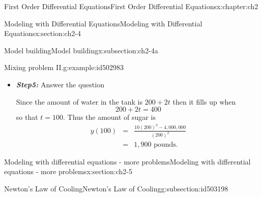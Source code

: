 \documentclass[oneside,10pt,]{book}
\newcommand{\alert}[1]{\textbf{\textit{#1}}}
\numberwithin{equation}{section}
\numberwithin{equation}{section}
\newcommand{\amp}{&}
\begin{document}
\begin{chapterptx}{First Order Differential Equations}{}{First Order Differential Equations}{}{}{x:chapter:ch2}
\begin{sectionptx}{Modeling with Differential Equations}{}{Modeling with Differential Equations}{}{}{x:section:ch2-4}
\begin{subsectionptx}{Model building}{}{Model building}{}{}{x:subsection:ch2-4a}
\begin{example}{Mixing problem II.}{g:example:id502983}
\begin{itemize}[label=\textbullet]
Thus using the formula, we have that%
\begin{align*}
y(t) \amp = \amp \frac{1}{\mu(t)}\left[\int\mu(t)b(t)dt.+C\right]\\
\amp = \amp \frac{1}{\left(100+t\right)^{2}}\left[30\int\left(100+t\right)^{2}dt.+C\right]\\
\amp = \amp \frac{1}{\left(100+t\right)^{2}}\left[30\frac{\left(100+t\right)^{3}}{3}.+C\right]\\
\amp = \amp \frac{1}{\left(100+t\right)^{2}}\left[10\left(100+t\right)^{3}+C\right]
\end{align*}
and using \(y(0)=600\) we get that%
\begin{equation*}
600=\frac{1}{100^{2}}\left[10\cdot100^{3}+C\right]
\end{equation*}
so that%
\begin{equation*}
C=-4,000,000
\end{equation*}
and thus%
\begin{equation*}
y(t)=\frac{10\left(100+t\right)^{3}-4,000,000}{\left(100+t\right)^{2}}.
\end{equation*}
%
\item{}\alert{Step5:} Answer the question%
\par
Since the amount of water in the tank is \(200+2t\) then it fills up when%
\begin{equation*}
200+2t=400
\end{equation*}
so that \(t=100\). Thus the amount of sugar is%
\begin{align*}
y(100) \amp = \amp \frac{10\left(200\right)^{3}-4,000,000}{\left(200\right)^{2}}\\
\amp = \amp 1,900\mbox{ pounds}.
\end{align*}
%
\end{itemize}
\end{example}
\end{subsectionptx}
\end{sectionptx}
%
%
\typeout{************************************************}
\typeout{************************************************}
%
\begin{sectionptx}{Modeling with differential equations - more problems}{}{Modeling with differential equations - more problems}{}{}{x:section:ch2-5}
%
%
\typeout{************************************************}
\typeout{************************************************}
%
\begin{subsectionptx}{Newton's Law of Cooling}{}{Newton's Law of Cooling}{}{}{g:subsection:id503198}

\end{subsectionptx}
\end{sectionptx}
\end{chapterptx}
\end{document}
